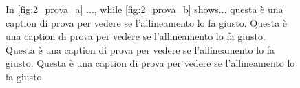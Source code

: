 \documentclass[rmp,10pt,onecolumn,fleqn,notitlepage]{revtex4-1}
\begin{document}
	\begin{figure}[H]
	\begin{minipage}[c]{0.49\linewidth}
	\end{minipage}
	\begin{minipage}[]{0.49\linewidth}
	\centering
	\end{minipage}
	\caption{\label{fig:2_prova} In \ref{fig:2_prova_a} ..., while \ref{fig:2_prova_b} shows... questa è una caption di prova per vedere se l'allineamento lo fa giusto. Questa è una caption di prova per vedere se l'allineamento lo fa giusto. Questa è una caption di prova per vedere se l'allineamento lo fa giusto. Questa è una caption di prova per vedere se l'allineamento lo fa giusto.}
	\end{figure}
%
\end{document}
